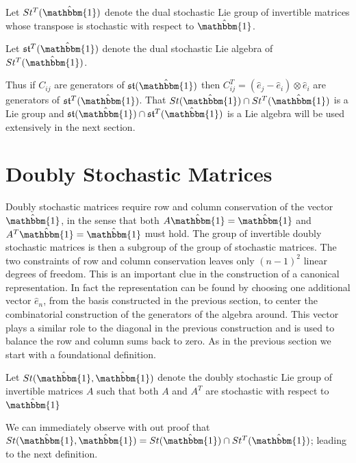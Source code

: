 \begin{definition}
	Let $St^T(\hat{\mathbbm{1}})$ denote the dual stochastic Lie group of 
	invertible matrices whose transpose is stochastic with respect to $\hat{\mathbbm{1}}$.
\end{definition}

\begin{definition}
	Let $\mathfrak{st}^T(\hat{\mathbbm{1}})$ denote the dual stochastic Lie 
	algebra of $St^T(\hat{\mathbbm{1}})$.
\end{definition}

Thus if $C_{ij}$ are generators of $\mathfrak{st}(\hat{\mathbbm{1}})$ then $C_{ij}^T = \left(\hat{e}_j - \hat{e}_i \right) \otimes \hat{e}_i$
are generators of $\mathfrak{st}^T(\hat{\mathbbm{1}})$. That $St(\hat{\mathbbm{1}}) \cap St^T(\hat{\mathbbm{1}})$ 
is a Lie group and $\mathfrak{st}(\hat{\mathbbm{1}}) \cap \mathfrak{st}^T(\hat{\mathbbm{1}})$ 
is a Lie algebra will be used extensively in the next section.

\section{Doubly Stochastic Matrices}
Doubly stochastic matrices require row and column conservation of the vector $\hat{\mathbbm{1}}$, 
in the sense that both $A \hat{\mathbbm{1}} = \hat{\mathbbm{1}}$ and $A^T \hat{\mathbbm{1}} = \hat{\mathbbm{1}}$ 
must hold. The group of invertible doubly stochastic matrices is then a subgroup
of the group of stochastic matrices. The two constraints of row and column 
conservation leaves only $\left(n - 1\right)^2$ linear degrees of freedom. This 
is an important clue in the construction of a canonical representation. In fact 
the representation can be found by choosing one additional vector $\hat{e}_n$, 
from the basis constructed in the previous section, to center the combinatorial 
construction of the generators of the algebra around. This vector plays a 
similar role to the diagonal in the previous construction and is used to balance 
the row and column sums back to zero. As in the previous section we start with 
a foundational definition.

\begin{definition}
	Let $St(\hat{\mathbbm{1}}, \hat{\mathbbm{1}})$ denote the doubly stochastic 
	Lie group of invertible matrices $A$ such that both $A$ and $A^T$ are 
	stochastic with respect to $\hat{\mathbbm{1}}$
\end{definition}

We can immediately observe with out proof that $St(\hat{\mathbbm{1}}, \hat{\mathbbm{1}}) = St(\hat{\mathbbm{1}}) \cap St^T(\hat{\mathbbm{1}})$;
leading to the next definition.

